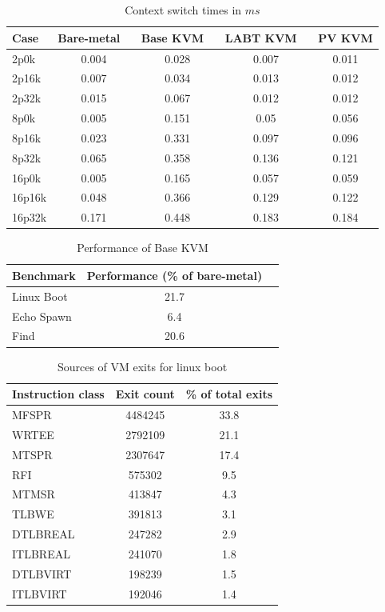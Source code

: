 \documentclass[10pt,twocolumn]{article}
\begin{document}
\begin{table}
\centering
\caption{Context switch times in $ms$}
      \begin{tabular}{|l | c| c |c |c|} \hline
       Case\verb, ,  & Bare-metal \verb, ,& Base KVM \verb, , & LABT KVM \verb, ,& PV KVM \\ \hline

2p0k	&	0.004	&	0.028	&	0.007	&	0.011	\\ \hline
2p16k	&	0.007	&	0.034	&	0.013	&	0.012	\\ \hline
2p32k	&	0.015	&	0.067	&	0.012	&	0.012	\\ \hline
8p0k	&	0.005	&	0.151	&	0.05	&	0.056	\\ \hline
8p16k	&	0.023	&	0.331	&	0.097	&	0.096	\\ \hline
8p32k	&	0.065	&	0.358	&	0.136	&	0.121	\\ \hline
16p0k	&	0.005	&	0.165	&	0.057	&	0.059	\\ \hline
16p16k	&	0.048	&	0.366	&	0.129	&	0.122	\\ \hline
16p32k	&	0.171	&	0.448	&	0.183	&	0.184	\\ \hline

        \hline
      \end{tabular}
\label{tab:lpGMKLsmall}
\end{table} 

\begin{table}[!b]
\centering
\caption{Performance of Base KVM}
     \begin{tabular}{lcc} \hline
       Benchmark  & Performance (\% of bare-metal) \\ \hline
       Linux Boot & 21.7 \\
       Echo Spawn & 6.4 \\
       Find & 20.6 \\
       \hline
     \end{tabular}
\label{tab:kvmperformance}
\end{table}


\begin{table}[!b]
\centering
\caption{Sources of VM exits for linux boot}
     \begin{tabular}{lcc} \hline
       Instruction class  & Exit count & \% of total exits  \\ \hline
       MFSPR & 4484245 & 33.8  \\
       WRTEE & 2792109 & 21.1  \\
       MTSPR & 2307647 & 17.4  \\
       RFI & 575302 & 9.5 \\
       MTMSR & 413847 & 4.3 \\
       TLBWE & 391813 & 3.1 \\
       DTLBREAL & 247282 & 2.9 \\
       ITLBREAL & 241070 & 1.8 \\
       DTLBVIRT & 198239 & 1.5 \\
       ITLBVIRT & 192046 & 1.4 \\
       \hline
     \end{tabular}
\label{tab:NumExitsBase}
\end{table}
\end{document}
